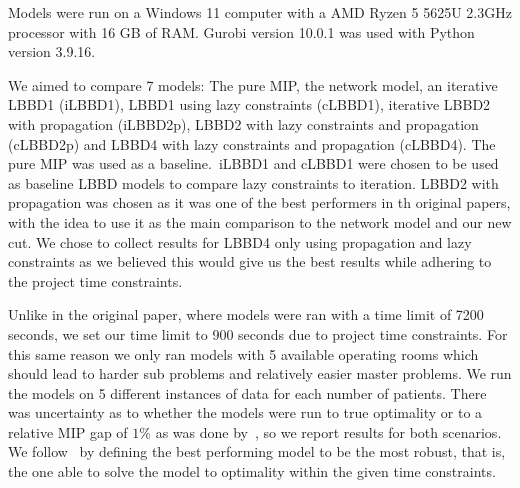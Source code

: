 Models were run on a Windows 11 computer with a AMD Ryzen 5 5625U 2.3GHz processor with 16 GB of RAM\@. Gurobi version 10.0.1 was used with Python version 3.9.16. 

We aimed to compare 7 models: The pure MIP, the network model, an iterative LBBD1 (iLBBD1), LBBD1 using lazy constraints (cLBBD1), iterative LBBD2 with propagation (iLBBD2p), LBBD2 with lazy constraints and propagation (cLBBD2p) and LBBD4 with lazy constraints and propagation (cLBBD4). The pure MIP was used as a baseline.\ iLBBD1 and cLBBD1  were chosen to be used as baseline LBBD models to compare lazy constraints to iteration. LBBD2 with propagation was chosen as it was one of the best performers in th original papers, with the idea to use it as the main comparison to the network model and our new cut. We chose to collect results for LBBD4 only using propagation and lazy constraints as we believed this would give us the best results while adhering to the project time constraints.

Unlike in the original paper, where models were ran with a time limit of 7200 seconds, we set our time limit to 900 seconds due to project time constraints. For this same reason we only ran models with 5 available operating rooms which should lead to harder sub problems and relatively easier master problems\cite{roshanaei2017propagating}. We run the models on 5 different instances of data for each number of patients. There was uncertainty as to whether the models were run to true optimality or to a relative MIP gap of $1\%$ as was done by~\cite{guo}, so we report results for both scenarios. We follow~\cite{roshanaei2017propagating} by defining the best performing model to be the most robust, that is, the one able to solve the model to optimality within the given time constraints.



